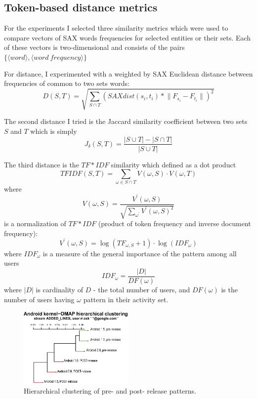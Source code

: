 \documentclass[10pt, conference, compsocconf]{IEEEtran}
\begin{document}
\subsection{Token-based distance metrics}
For the experiments I selected three similarity metrics which were used to compare 
vectors of SAX words frequencies for selected entities or their sets. Each of these
vectors is two-dimensional and consists of the 
pairs $\{\langle word\rangle,\langle word \: frequency\rangle\}$

For distance, I experimented with a weighted by SAX Euclidean 
distance between frequencies of common to two sets words:
\begin{equation}
D(S,T) = \sqrt{ \sum_{S\cap T} (SAXdist(s_{i},t_{i}) * \lVert F_{s_{i}}-F_{t_{i}} \rVert )^{2}  }
\end{equation} 

The second distance I tried is the Jaccard similarity coefficient between two 
sets $S$ and $T$ which is simply 
\begin{equation}
J_{\delta}(S,T) = \frac{|S\cup T| - |S\cap T|}{|S\cup T|}
\end{equation} 

The third distance is the $TF\ast IDF$ similarity which defined as a dot product 
\begin{equation}
 TFIDF(S,T) = \sum_{\omega \in S \cap T} V(\omega, S) \cdot V(\omega, T)
\end{equation} 
where 
\begin{equation}
 V(\omega, S) = \frac { V^{\prime} (\omega,S) } { \sqrt{ \sum_{\omega^{\prime}} V^{\prime} (\omega,S)^{2}} }
\end{equation} 
is a normalization of $TF\ast IDF$ (product of token frequency and inverse document frequency):
\begin{equation}
 V^{\prime} (\omega,S) = \log(TF_{\omega, S} +1) \cdot \log(IDF_{\omega})
\end{equation} 
where $IDF_{\omega}$ is a measure of the general importance of the pattern among all users
\begin{equation}
 IDF_{\omega} = \frac{|D|}{DF(\omega)}
\end{equation} 
where $|D|$ is cardinality of $D$ - the total number of users, and $DF(\omega)$ is the number of users having $\omega$ pattern in their activity set.

\begin{figure}[htb]
  \centering
  \includegraphics[width=0.5\textwidth]{figures/omap-hclust.eps}
  \caption{Hierarchical clustering of pre- and post- release patterns.}
  \label{fig:kernel_cluster}
\end{figure}
\end{document}
